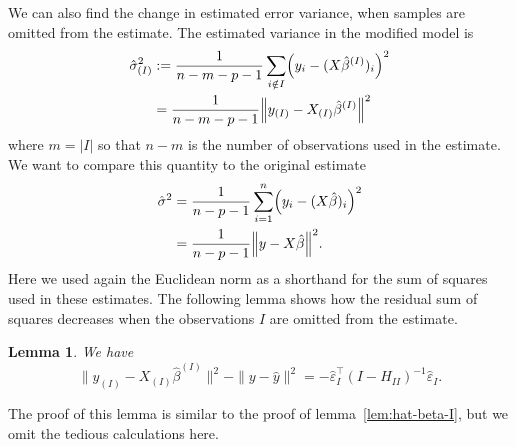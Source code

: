 \documentclass[
  a4paper,
]{article}
\newtheorem{lemma}{Lemma}[section]
\theoremstyle{definition}
\theoremstyle{definition}
\theoremstyle{definition}
\theoremstyle{definition}
\theoremstyle{remark}
\begin{document}
We can also find the change in estimated error variance, when samples
are omitted from the estimate. The estimated variance in the modified model
is
\begin{align*}
  \hat\sigma_{(I)}^2
  &:= \frac{1}{n-m-p-1} \sum_{i\notin I} \Bigl( y_i - (X\hat\beta^{(I)})_i \Bigr)^2 \\
  &= \frac{1}{n-m-p-1} \Bigl\| y_{(I)} - X_{(I)} \hat\beta^{(I)} \Bigr\|^2
\end{align*}
where \(m = |I|\) so that \(n-m\) is the number of observations used
in the estimate. We want to compare this quantity to the original estimate
\begin{align*}
  \hat\sigma^2
  &= \frac{1}{n-p-1} \sum_{i=1}^n \Bigl( y_i - (X\hat\beta)_i \Bigr)^2 \\
  &= \frac{1}{n-p-1} \Bigl\| y - X \hat\beta \Bigr\|^2.
\end{align*}
Here we used again the Euclidean norm as a shorthand for the sum of squares
used in these estimates. The following lemma shows how the residual sum
of squares decreases when the observations \(I\) are omitted from the
estimate.

\begin{lemma}
\protect\hypertarget{lem:sigma-I}{}\label{lem:sigma-I}We have
\begin{equation*}
  \| y_{(I)} - X_{(I)} \hat\beta^{(I)} \|^2 - \| y - \hat y \|^2
  = - \hat\varepsilon_I^\top (I - H_{II})^{-1} \hat\varepsilon_I.
\end{equation*}
\end{lemma}

The proof of this lemma is similar to the proof of lemma~\ref{lem:hat-beta-I},
but we omit the tedious calculations here.
\end{document}
